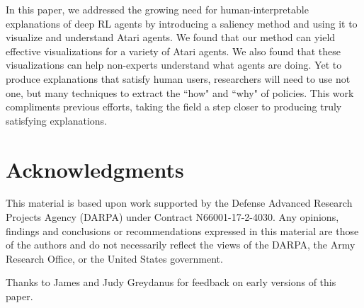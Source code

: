 \documentclass{article}
\begin{document}
In this paper, we addressed the growing need for human-interpretable explanations of deep RL agents by introducing a saliency method and using it to visualize and understand Atari agents. We found that our method can yield effective visualizations for a variety of Atari agents. We also found that these visualizations can help non-experts understand what agents are doing. Yet to produce explanations that satisfy human users, researchers will need to use not one, but many techniques to extract the ``how" and ``why" of policies. This work compliments previous efforts, taking the field a step closer to producing truly satisfying explanations.


\section*{Acknowledgments}

This material is based upon work supported by the Defense Advanced Research Projects Agency (DARPA) under Contract N66001-17-2-4030. Any opinions, findings and conclusions or recommendations expressed in this material are those of the authors and do not necessarily reflect the views of the DARPA, the Army Research Office, or the United States government.

Thanks to James and Judy Greydanus for feedback on early versions of this paper.



\end{document}
